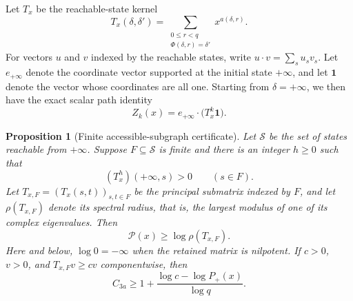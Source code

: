 \documentclass[11pt]{article}
\newtheorem{proposition}{Proposition}
\begin{document}
Let $T_x$ be the reachable-state kernel
\begin{equation}\label{eq:carry-operator}
 T_x(\delta,\delta')=
 \sum_{\substack{0\le r<q\\\Phi(\delta,r)=\delta'}}x^{a(\delta,r)}.
\end{equation}
For vectors $u$ and $v$ indexed by the reachable states, write
$u\cdot v=\sum_s u_s v_s$.  Let $e_{+\infty}$ denote
the coordinate vector supported at the initial state $+\infty$, and let
$\mathbf1$ denote the vector whose coordinates are all one.  Starting from
$\delta=+\infty$, we then have the exact scalar path identity
\begin{equation}\label{eq:carry-path-identity}
 Z_k(x)=e_{+\infty}\cdot\bigl(T_x^k\mathbf1\bigr).
\end{equation}

\begin{proposition}[Finite accessible-subgraph certificate]
\label{prop:controlled-finite-graph}
Let $\mathcal S$ be the set of states reachable from $+\infty$.  Suppose
$F\subseteq\mathcal S$ is finite and there is an integer $h\ge0$ such that
\[
 (T_x^h)(+\infty,s)>0\qquad(s\in F).
\]
Let $T_{x,F}=(T_x(s,t))_{s,t\in F}$ be the principal submatrix indexed by
$F$, and let $\rho(T_{x,F})$ denote its spectral radius, that is, the largest
modulus of one of its complex eigenvalues.  Then
\[
 \mathcal P(x)\ge\log\rho(T_{x,F}).
\]
Here and below, $\log0=-\infty$ when the retained matrix is nilpotent.
If $c>0$, $v>0$, and $T_{x,F}v\ge cv$ componentwise, then
\begin{equation}\label{eq:controlled-collatz}
 C_{3a}\ge1+\frac{\log c-\log P_+(x)}{\log q}.
\end{equation}
\end{proposition}
\end{document}
